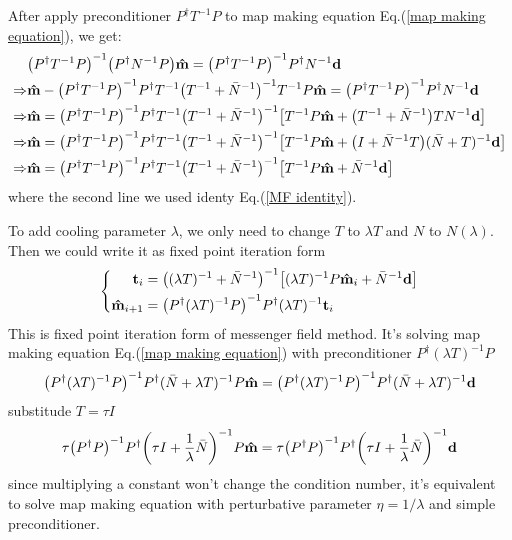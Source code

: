 \documentclass[11pt, letterpaper]{article}
\newcommand{\vbd}{\vb{d}}
\newcommand{\inv}[1]{#1^{-1}}
\newcommand{\hatm}{\vb{\hat{m}}}
\newcommand{\Pdagger}{P^{\dagger}}
\newcommand{\Nbar}{\bar{N}}
\newcommand{\PPinv}[1]{\inv{\qty(\Pdagger #1 P)}}
\begin{document}
After apply preconditioner $\Pdagger \inv{T} P$ to map making equation
Eq.(\ref{map making equation}), we get:
\begin{align}
\begin{aligned}[b]
\mathrel{\phantom{\Rightarrow}}
&\PPinv{\inv{T}} \qty(\Pdagger \inv{N} P) \hatm
= \PPinv{\inv{T}} \Pdagger \inv{N} \vbd
\\ \Rightarrow
&\hatm - \PPinv{\inv{T}} \Pdagger \inv{T} 
    \inv{\qty(\inv{T}+\inv{\Nbar})} \inv{T} P\hatm
= \PPinv{\inv{T}} \Pdagger \inv{N} \vbd
\\ \Rightarrow
& \hatm = \PPinv{\inv{T}} \Pdagger \inv{T} \inv{\qty(\inv{T} + \inv{\Nbar})} 
    \qty[ \inv{T}P\hatm + \qty(\inv{T}+\inv{\Nbar}) T \inv{N}\vbd]
\\ \Rightarrow
& \hatm = \PPinv{\inv{T}} \Pdagger \inv{T} \inv{\qty(\inv{T} + \inv{\Nbar})} 
    \qty[ \inv{T}P\hatm + \qty(I+\inv{\Nbar}T) \inv{(\Nbar + T)}\vbd]
\\ \Rightarrow
& \hatm = \PPinv{\inv{T}} \Pdagger \inv{T} 
    \inv{\qty(\inv{T} + \inv{\Nbar})} \qty[ \inv{T}P\hatm + \inv{\Nbar}\vbd]
\end{aligned}
\end{align}
where the second line we used identy Eq.(\ref{MF identity}).

To add cooling parameter $\lambda$, we only need to change $T$ to $\lambda T$
and $N$ to $N(\lambda)$.
Then we could  write it as fixed point iteration form
\begin{equation}
\left\{\!
\begin{aligned}
\vb{t}_i &= \inv{\qty(\inv{(\lambda T)} + \inv{\Nbar})} 
    \qty[ \inv{(\lambda T)}P\hatm_i + \inv{\Nbar}\vbd]\\
\hatm_{i+1} &= \PPinv{\inv{(\lambda T)}} \Pdagger \inv{(\lambda T)} \vb{t}_i 
\end{aligned}
\right.
\end{equation}
This is fixed point iteration form of messenger field method.
It's solving map making equation Eq.(\ref{map making equation}) with
preconditioner $\Pdagger \inv{(\lambda T)} P$
\begin{align}
\PPinv{\inv{(\lambda T)}} \Pdagger \inv{(\Nbar + \lambda T)} P \hatm
= \PPinv{\inv{(\lambda T)}} \Pdagger \inv{(\Nbar + \lambda T)} \vbd
\end{align}
substitude $T = \tau I$ 
\begin{align}
\tau \PPinv{} \Pdagger \inv{\qty(\tau I + \frac{1}{\lambda}\Nbar)} P \hatm 
= \tau \PPinv{} \Pdagger \inv{\qty(\tau I + \frac{1}{\lambda}\Nbar)} \vbd
\label{lambda eta equiv}
\end{align}
since multiplying a constant won't change the condition number, it's equivalent
to solve map making equation with perturbative parameter $\eta = 1/\lambda$ and
simple preconditioner.
\end{document}
